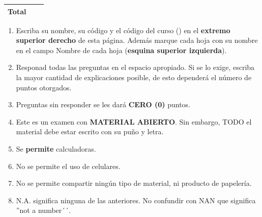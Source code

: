 \begin{table}[h]
{\begin{tabular}{lll}
\multicolumn{1}{|l|}{Total} & \multicolumn{1}{l|}{} & \multicolumn{1}{l|}{} \\ \hline
\end{tabular}
}
\begin{minipage}[c]{0.6\textwidth}%
	\begin{scriptsize}
		\begin{enumerate}
		\item Escriba su nombre, su código y el código del curso (\codeOfCurseA) en el \textbf{extremo superior derecho} de esta página. Además marque cada hoja con su nombre en el campo Nombre de cada hoja (\textbf{esquina superior izquierda}).
		\item Responad todas las preguntas en el espacio apropiado. Si se lo exige, escriba la mayor cantidad de explicaciones posible, de esto dependerá el número de puntos otorgados.
		\item Preguntas sin responder se les dará \textbf{CERO (0)} puntos.
		\item Este es un examen con \textbf{MATERIAL ABIERTO}. Sin embargo, TODO el material debe estar escrito con su puño y letra.
		\item Se \textbf{permite} calculadoras.
		\item No se permite el uso de celulares.
		\item No se permite compartir ningún tipo de material, ni producto de papelería.
		\item N.A. significa ninguna de las anteriores. No confundir con NAN que significa ''not a number´´.
		\end{enumerate}
	\end{scriptsize}
\end{minipage}
\end{table}

